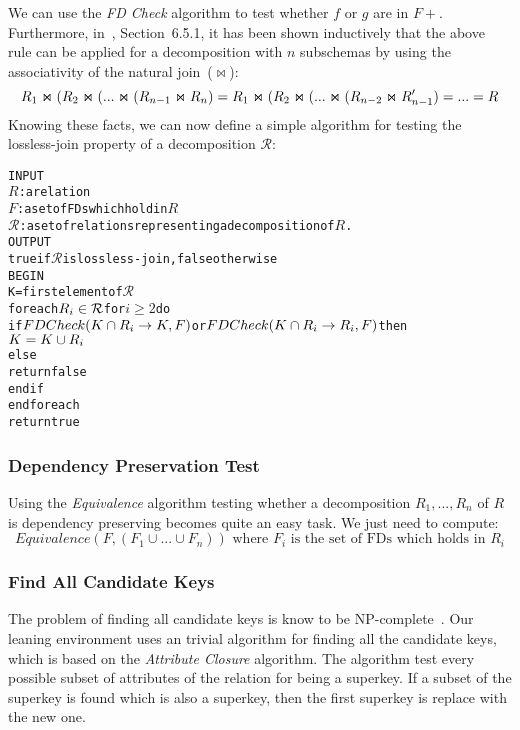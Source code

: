 We can use the \textit{FD Check} algorithm to test whether $f$ or $g$ are in $F+$. Furthermore,
in~\cite{bdb2}, Section~6.5.1, it has been shown inductively that the above rule can be applied for a 
decomposition with $n$ subschemas by using the associativity of the natural join~($\Join$):
$$
  R_1 \Join (R_2 \Join (...\Join(R_{n-1} \Join R_{n}) \\
  =R_1 \Join (R_2 \Join (...\Join(R_{n-2} \Join R_{n-1}')  \\
  =
  ...
  = R
$$
Knowing these facts, we can now define a simple algorithm for testing the lossless-join
property of a decomposition \(\mathcal{R}\):
   
\begin{alltt}
INPUT 
  \(R\) : a relation
  \(F\) : a set of FDs which hold in \(R\)
  \(\mathcal{R}\) : a set of relations representing a decomposition of \(R\).
OUTPUT 
  true if  \(\mathcal{R}\) is lossless-join, false otherwise
BEGIN
  K = first element of \(\mathcal{R}\)
  foreach \(R\sb{i} \in \mathcal{R}\) for \(i \geq 2\) do
    if \(FDCheck(K \cap R\sb{i} \rightarrow K, F)\) or \(FDCheck(K \cap R\sb{i} \rightarrow R\sb{i}, F)\) then
      \(K = K \cup R\sb{i}\)
    else
      return false
    end if
  end foreach
  return true
\end{alltt}


\subsubsection{Dependency Preservation Test} 
Using the \textit{Equivalence} algorithm testing whether a decomposition $R_1,...,R_n$ of $R$ is dependency preserving
becomes quite an easy task. We just need to compute: $$Equivalence(F, (F_1 \cup ... \cup F_n)) \mbox{ where } F_i \mbox{ is the set of FDs which holds in } R_i$$ 

\subsubsection{Find All Candidate Keys}
The problem of finding all candidate keys is know to be NP-complete~\cite{p3}. 
Our leaning environment uses an trivial algorithm for finding all the candidate keys,
which is based on the \textit{Attribute Closure} algorithm. The algorithm test every possible
subset of attributes of the relation for being a superkey. If a subset of the superkey
is found which is also a superkey, then the first superkey is replace with the new one.   

